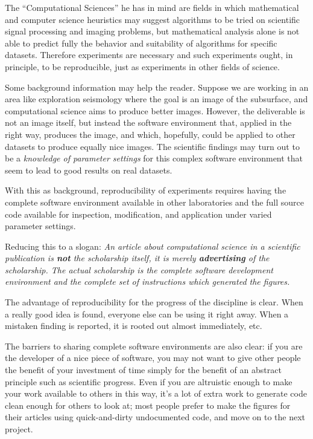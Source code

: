 \documentclass{article}
\begin{document}
The ``Computational Sciences'' he has in mind are fields in which mathematical and computer science
heuristics may suggest algorithms to be tried on scientific signal processing and imaging problems,
but mathematical analysis alone is not able to predict fully the behavior and suitability of
algorithms for specific datasets. Therefore experiments are necessary and such experiments ought,
in principle, to be reproducible, just as experiments in other fields of science.

Some background information may help the reader.  Suppose we are working in an area like
exploration seismology where the goal is an image of the subsurface, and computational science
aims to produce better images. However, the deliverable is not an image itself, but instead the
software environment that, applied in the right way, produces the image, and which, hopefully,
could be applied to other datasets to produce equally nice images. The scientific findings may turn
out to be a {\it knowledge of parameter settings} for this complex software environment that seem
to lead to good results on real datasets.

With this as background, reproducibility of experiments requires  having the complete software
environment available in other  laboratories and the full source code available for inspection,
modification, and application under varied parameter settings.

Reducing this to a slogan: {\it An article about computational science in a scientific publication
is {\bf not} the scholarship itself, it is merely {\bf advertising} of the scholarship.  The actual
scholarship is the complete software development environment and the complete set of instructions
which generated the figures.}

The advantage of reproducibility for the progress of the discipline is clear. When a really good
idea is found, everyone else can be using it right away. When a  mistaken finding is reported, it
is rooted out almost immediately, etc.

The barriers to sharing complete software environments are also clear: if you are the developer of
a nice piece of software, you may not want to give other people the benefit of your investment of
time simply for the benefit of an abstract principle such as scientific progress. Even if you are
altruistic enough to  make your work available to others in this way, it's a lot of extra work to
generate code clean enough for others to look at; most people prefer to make the figures for their
articles using quick-and-dirty undocumented code, and move on to the next project.
\end{document}
